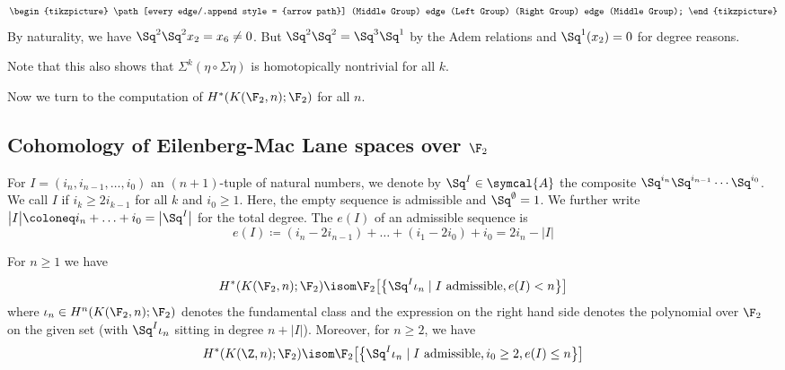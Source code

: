 \begin{example}
\begin{equation*}
\begin{tikzpicture}
			\path[every edge/.append style = {arrow path}]
				(Middle Group) edge (Left Group)
				(Right Group) edge (Middle Group);
		\end{tikzpicture}
	\end{equation*}
	By naturality, we have $\Sq^2 \Sq^2 x_2 = x_6 \neq 0$.
	But $\Sq^2 \Sq^2 = \Sq^3 \Sq^1$ by the Adem relations and $\Sq^1(x_2) = 0$ for degree reasons.

	Note that this also shows that $\Sigma^k(\eta \circ \Sigma \eta)$ is homotopically nontrivial for all $k$.
\end{example}

Now we turn to the computation of $H^*(K(\F_2, n); \F_2)$ for all $n$.
\subsection{Cohomology of Eilenberg-Mac Lane spaces over \texorpdfstring{$\F_2$}{F2}}
\begin{definition}
	For $I = (i_n, i_{n - 1}, \ldots, i_0)$ an $(n + 1)$-tuple of natural numbers, we denote by $\Sq^I \in \symcal{A}$ the composite $\Sq^{i_n} \Sq^{i_{n - 1}} \cdots \Sq^{i_0}$.
	We call $I$  if $i_k \geq 2 i_{k - 1}$ for all $k$ and $i_0 \geq 1$.
	Here, the empty sequence is admissible and $\Sq^{\emptyset} = 1$.
	We further write $\big|I\big| \coloneq i_n + \ldots + i_0 = \big|\Sq^I\big|$ for the total degree.
	The  $e(I)$ of an admissible sequence is 
	\begin{equation*}
		e(I) \coloneq (i_n - 2 i_{n - 1}) + \ldots + (i_1 - 2 i_0) + i_0 = 2 i_n - \big|I\big|
	\end{equation*}
\end{definition}
\begin{theorem}\label{thm:cartanserre}
	For $n \geq 1$ we have 
	\begin{equation*}
		H^*(K(\F_2, n); \F_2) \isom \F_2\big[\big\{\Sq^I \iota_n \mid I \text{ admissible}, e(I) < n\big\}\big]
	\end{equation*}
	where $\iota_n \in H^n(K(\F_2, n); \F_2)$ denotes the fundamental class and the expression on the right hand side denotes the polynomial over $\F_2$ on the given set (with $\Sq^I \iota_n$ sitting in degree $n + \big|I\big|$).
	Moreover, for $n \geq 2$, we have 
	\begin{equation*}
		H^*(K(\Z, n); \F_2) \isom \F_2\big[\big\{\Sq^I \iota_n \mid I \text{ admissible}, i_0 \geq 2, e(I) \leq n\big\}\big]
	\end{equation*}
\end{theorem}
